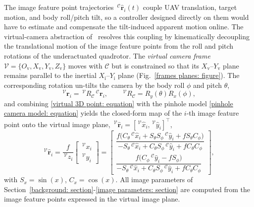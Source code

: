 \documentclass{IEEEtaes}
\begin{document}
The image feature point trajectories $\,^\mathcal{C}\hat{\boldsymbol{r}}_i(t)$ couple UAV translation, target motion, and body roll/pitch tilt, so a controller designed directly on them would have to estimate and compensate the tilt-induced apparent motion online. The virtual-camera abstraction of~\cite{fink2017,xie2016_2} resolves this coupling by kinematically decoupling the translational motion of the image feature points from the roll and pitch rotations of the underactuated quadrotor. The \emph{virtual camera frame} $\mathcal{V}=\{O_{\text{v}},X_{\text{v}},Y_{\text{v}},Z_{\text{v}}\}$ moves with $\mathcal{C}$ but is constrained so that its $X_{\text{v}}$--$Y_{\text{v}}$ plane remains parallel to the inertial $X_{\text{i}}$--$Y_{\text{i}}$ plane (Fig.~\ref{frames planes: figure}). The corresponding rotation un-tilts the camera by the body roll $\phi$ and pitch $\theta$,
\begin{equation}
\label{virtual 3D point: equation}
    \,^\mathcal{V}\boldsymbol{r}_i = \,^\mathcal{V}R_\mathcal{C}\,^\mathcal{C}\boldsymbol{r}_i, \qquad \,^\mathcal{V}R_\mathcal{C} = R_y(\theta)R_x(\phi),
\end{equation}
and combining \eqref{virtual 3D point: equation} with the pinhole model \eqref{pinhole camera model: equation} yields the closed-form map of the $i$-th image feature point onto the virtual image plane, $\,^\mathcal{V}\hat{\boldsymbol{r}}_i=[\,^\mathcal{V}\hat{x}_i,\,^\mathcal{V}\hat{y}_i]^\top$,
\begin{equation}
\label{virtual feature point: equation}
    \,^\mathcal{V}\hat{\boldsymbol{r}}_i = \frac{f}{\,^\mathcal{V}z_i}\begin{bmatrix} \,^\mathcal{V}x_i \\ \,^\mathcal{V}y_i \end{bmatrix} = \begin{bmatrix}
        \dfrac{f\big(C_\theta\,^\mathcal{C}\hat{x}_i + S_\theta S_\phi\,^\mathcal{C}\hat{y}_i + f S_\theta C_\phi\big)}{-S_\theta\,^\mathcal{C}\hat{x}_i + C_\theta S_\phi\,^\mathcal{C}\hat{y}_i + f C_\theta C_\phi} \\[4pt]
        \dfrac{f\big(C_\phi\,^\mathcal{C}\hat{y}_i - f S_\phi\big)}{-S_\theta\,^\mathcal{C}\hat{x}_i + C_\theta S_\phi\,^\mathcal{C}\hat{y}_i + f C_\theta C_\phi}
    \end{bmatrix},
\end{equation}
with $S_x=\sin(x)$, $C_x=\cos(x)$. All image parameters of Section~\ref{background: section}-\ref{image parameters: section} are computed from the image feature points expressed in the virtual image plane.
\end{document}
